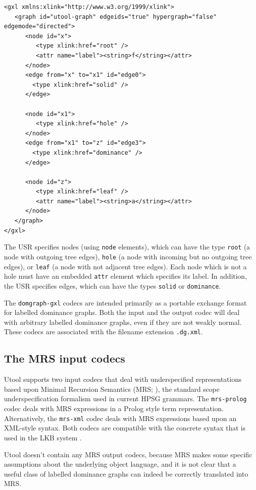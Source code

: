 \begin{verbatim}
<gxl xmlns:xlink="http://www.w3.org/1999/xlink">
   <graph id="utool-graph" edgeids="true" hypergraph="false" edgemode="directed">
      <node id="x">
         <type xlink:href="root" />
         <attr name="label"><string>f</string></attr>
      </node>
      <edge from="x" to="x1" id="edge0">
        <type xlink:href="solid" />
      </edge>

      <node id="x1">
         <type xlink:href="hole" />
      </node>
      <edge from="x1" to="z" id="edge3">
        <type xlink:href="dominance" />
      </edge>

      <node id="z">
         <type xlink:href="leaf" />
         <attr name="label"><string>a</string></attr>
      </node>
   </graph>
</gxl>
\end{verbatim}

The USR specifies nodes (using \verb?node? elements), which can have
the type \verb?root? (a node with outgoing tree edges), \verb?hole? (a
node with incoming but no outgoing tree edges), or \verb?leaf? (a node
with not adjacent tree edges). Each node which is not a hole must have
an embedded \verb?attr? element which specifies its label. In
addition, the USR specifies edges, which can have the types
\verb?solid? or \verb?dominance?.

The \verb?domgraph-gxl? codecs are intended primarily as a portable exchange
format for labelled dominance graphs. Both the input and the output codec
will deal with arbitrary labelled dominance graphs, even if they are not
weakly normal. These codecs are associated with the filename extension
\verb?.dg.xml?.



\subsection{The MRS input codecs}

Utool supports two input codecs that deal with underspecified
representations based upon Minimal Recursion Semantics (MRS;
), the standard scope underspecification formalism
used in current HPSG grammars. The \verb|mrs-prolog| codec deals with
MRS expressions in a Prolog style term representation. Alternatively,
the \verb|mrs-xml| codec deals with MRS expressions based upon an
XML-style syntax. Both codecs are compatible with the concrete syntax
that is used in the LKB system \cite{Copestake:LKB-Book}.

Utool doesn't contain any MRS output codecs, because MRS makes some
specific assumptions about the underlying object language, and it is
not clear that a useful class of labelled dominance graphs can indeed
be correctly translated into MRS.

